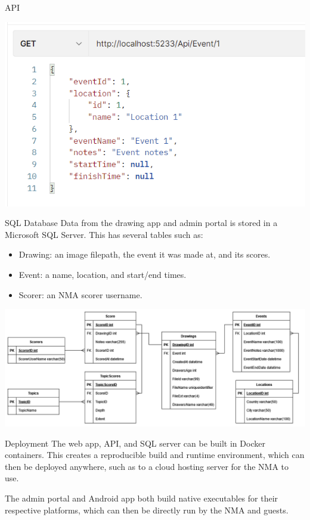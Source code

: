 \documentclass{beamer}
\begin{document}
\begin{frame}[fragile]
\begin{columns}[T]
\begin{column}{.46\textwidth}
\begin{block}{API}
        \begin{center}
            \includegraphics[width=0.6\linewidth]{images/api.png}
        \end{center}
    \end{block}

    \begin{block}{SQL Database}
        Data from the drawing app and admin portal is stored in a Microsoft SQL Server. This has several tables such as:
        \vspace{1ex}

        \begin{itemize}
            \item Drawing: an image filepath, the event it was made at, and its scores.
            \item Event: a name, location, and start/end times.
            \item Scorer: an NMA scorer username.
        \end{itemize}
        \vspace{1ex}

        \begin{center}
            \includegraphics[width=0.65\linewidth]{images/erd.png}
        \end{center}
    \end{block}

    \begin{block}{Deployment}
        The web app, API, and SQL server can be built in Docker containers. This creates a reproducible build and runtime environment, which can then be deployed anywhere, such as to a cloud hosting server for the NMA to use.
        \vspace{1ex}

        The admin portal and Android app both build native executables for their respective platforms, which can then be directly run by the NMA and guests.
    \end{block}

\end{column}

\end{columns}

\end{frame}
\end{document}
